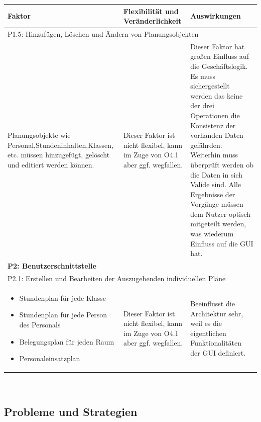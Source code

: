 \documentclass[fontsize=12pt,paper=a4,twoside]{scrartcl}
\begin{document}
\begin{tabularx}{\textwidth}{|X|X|X|}
\hline
\textbf{Faktor} & \textbf{Flexibilität und Veränderlichkeit} & \textbf{Auswirkungen}\\\hline
\hline
\hline
\multicolumn{3}{|l|}{P1.5: Hinzufügen, Löschen und Ändern von Planungsobjekten}\\\hline
Planungsobjekte wie Personal,Stundeninhalten,Klassen, etc. müssen hinzugefügt, gelöscht und editiert werden können.& Dieser Faktor ist nicht flexibel, kann im Zuge von O4.1 aber ggf. wegfallen. & Dieser Faktor hat großen Einfluss auf die Geschäftslogik. Es muss sichergestellt werden das keine der drei Operationen die Konsistenz der vorhanden Daten gefährden. Weiterhin muss überprüft werden ob die Daten in sich Valide sind. Alle Ergebnisse der Vorgänge müssen dem Nutzer optisch mitgeteilt werden, was wiederum Einfluss auf die GUI hat. \\\hline
\multicolumn{3}{|l|}{\textbf{P2: Benutzerschnittstelle}}\\\hline
\multicolumn{3}{|l|}{P2.1: Erstellen und Bearbeiten der Auszugebenden individuellen Pläne}\\\hline
\begin{itemize}
\item Stundenplan für jede Klasse
\item Stundenplan für jede Person des Personals
\item Belegungsplan für jeden Raum
\item Personaleinsatzplan 
\end{itemize} & Dieser Faktor ist nicht flexibel, kann im Zuge von O4.1 aber ggf. wegfallen. & Beeinflusst die Architektur sehr, weil es die eigentlichen Funktionalitäten der GUI definiert.
\\\hline
\end{tabularx}\\

\newpage
\subsection{Probleme und Strategien}
\label{sec:strategien}
\end{document}
